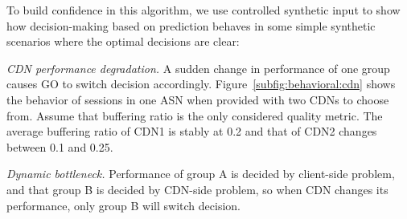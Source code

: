

To build confidence in this algorithm, we use controlled synthetic input to show how decision-making based on prediction behaves in some simple synthetic scenarios where the optimal decisions are clear:
\begin{packedenumerate}
  \item {\it CDN performance degradation.} A sudden change in performance of one group causes GO to switch decision accordingly. Figure~\ref{subfig:behavioral:cdn} shows the behavior of sessions in one ASN when provided with two CDNs to choose from. Assume that buffering ratio is the only considered quality metric. The average buffering ratio of CDN1 is stably at 0.2 and that of CDN2 changes between 0.1 and 0.25.
  \item {\it Dynamic bottleneck.} Performance of group A is decided by client-side problem, and that group B is decided by CDN-side problem, so when CDN changes its performance, only group B will switch decision.
\end{packedenumerate}

\begin{figure}[h!]
\centering
{}
\label{fig:behavioral}
\end{figure}


